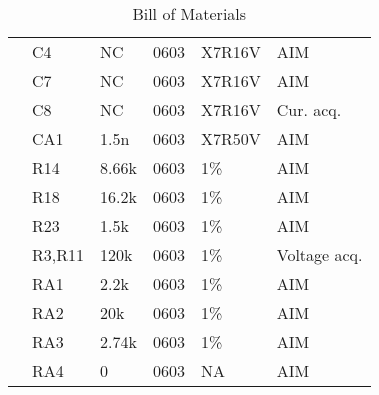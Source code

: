 \begin{table}[H]
{\begin{tabular}{@{}llllll@{}}
                   & C4 & NC & 0603 & X7R16V & AIM \\
                   & C7 & NC & 0603 & X7R16V & AIM \\
                   & C8 & NC & 0603 & X7R16V & Cur. acq. \\
                   & CA1 & 1.5n & 0603 & X7R50V & AIM \\
                   & R14 & 8.66k & 0603 & 1\% & AIM \\
                   & R18 & 16.2k & 0603 & 1\% & AIM \\
                   & R23 & 1.5k & 0603 & 1\% & AIM \\
                   & R3,R11 & 120k & 0603 & 1\% & Voltage acq. \\
                   & RA1 & 2.2k & 0603 & 1\% & AIM \\
                   & RA2 & 20k & 0603 & 1\% & AIM \\
                   & RA3 & 2.74k & 0603 & 1\% & AIM \\
                   & RA4 & 0 & 0603 & NA & AIM \\ \bottomrule
\end{tabular}}
\caption{Bill of Materials}
\label{tab:bom}
\end{table}